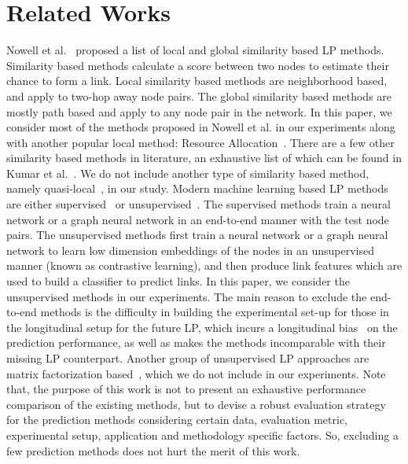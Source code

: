 \section{Related Works}
\label{Rel}
Nowell et al.~\cite{liben2007link} proposed a list of local and global similarity based LP methods. Similarity based methods calculate a score between two nodes to estimate their chance to form a link. Local similarity based methods are neighborhood based, and apply to two-hop away node pairs. The global similarity based methods are mostly path based and apply to any node pair in the network. In this paper, we consider most of the methods proposed in Nowell et al. in our experiments along with another popular local method: Resource Allocation~\cite{zhou2009predicting}. There are a few other similarity based methods in literature, an exhaustive list of which can be found in Kumar et al.~\cite{kumar2020link}. We do not include another type of similarity based method, namely quasi-local~\cite{kumar2020link}, in our study. Modern machine learning based LP methods are either supervised~\cite{zhang2018link,cai2020multi,pan2021neural,tan2023bring} or unsupervised~\cite{perozzi2014deepwalk,grover2016node2vec,hamilton2017inductive,he2020lightgcn}. The supervised methods train a neural network or a graph neural network in an end-to-end manner with the test node pairs. The unsupervised methods first train a neural network or a graph neural network to learn low dimension embeddings of the nodes in an unsupervised manner (known as contrastive learning), and then produce link features which are used to build a classifier to predict links. In this paper, we consider the unsupervised methods in our experiments. The main reason to exclude the end-to-end methods is the difficulty in building the experimental set-up for those in the longitudinal setup for the future LP, which incurs a longitudinal bias~\cite{lichtenwalter2010new,yang2015evaluating} on the prediction performance, as well as makes the methods incomparable with their missing LP counterpart. Another group of unsupervised LP approaches are matrix factorization based~\cite{menon2011link,chen2017link}, which we do not include in our experiments. Note that, the purpose of this work is not to present an exhaustive performance comparison of the existing methods, but to devise a robust evaluation strategy for the prediction methods considering certain data,  evaluation metric, experimental setup, application and methodology specific factors. So, excluding a few prediction methods does not hurt the merit of this work.

